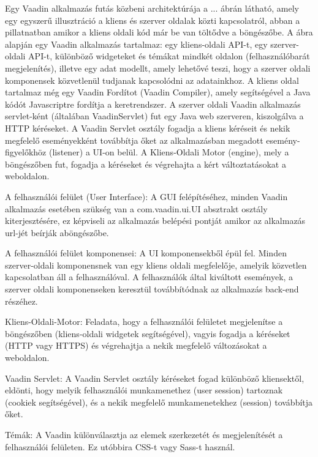 \par Egy Vaadin alkalmazás futás közbeni architektúrája a ... ábrán látható, amely egy egyszerű illusztráció a kliens és szerver oldalak közti kapcsolatról, abban a pillatnatban amikor a kliens oldali kód már be van töltődve a böngészőbe. A ábra alapján egy Vaadin alkalmazás tartalmaz: egy kliens-oldali API-t, egy szerver-oldali API-t, különböző widgeteket és témákat mindkét oldalon (felhasználóbarát megjelenítés), illetve egy adat modellt, amely lehetővé teszi, hogy a szerver oldali komponensek közvetlenül tudjanak kapcsolódni az adatainkhoz. A kliens oldal tartalmaz még egy Vaadin Fordítot (Vaadin Compiler), amely segítségével a Java kódót Javascriptre fordítja a keretrendszer. A szerver oldali Vaadin alkalmazás servlet-ként (általában VaadinServlet) fut egy Java web szerveren, kiszolgálva a HTTP kéréseket. A Vaadin Servlet osztály fogadja a kliens kéréseit és nekik megfelelő eseményekként továbbítja őket az alkalmazásban megadott esemény-ﬁgyelőkhöz (listener) a UI-on belül. A Kliens-Oldali Motor (engine), mely a böngészőben fut, fogadja a kéréseket és végrehajta a kért változtatásokat a weboldalon.
\par A felhasználói felület (User Interface): A GUI felépítéséhez, minden Vaadin alkalmazás esetében szükség van a com.vaadin.ui.UI absztrakt osztály kiterjesztésére, ez képviseli az alkalmazás belépési pontját amikor az alkalmazás url-jét beírják aböngészőbe.
\par A felhasználói felület komponensei: A UI komponensekből épül fel. Minden szerver-oldali komponensnek van egy kliens oldali megfelelője, amelyik közvetlen kapcsolatban áll a felhasználóval. A felhasználók által kiváltott események, a szerver oldali komponenseken keresztül továbbítódnak az alkalmazás back-end részéhez.
\par Kliens-Oldali-Motor: Feladata, hogy a felhasználói felületet megjelenítse a böngészőben (kliens-oldali widgetek segítségével), vagyis fogadja a kéréseket (HTTP vagy HTTPS) és végrehajtja a nekik megfelelő változásokat a weboldalon.
\par Vaadin Servlet: A Vaadin Servlet osztály kéréseket fogad különböző kliensektől, eldönti, hogy melyik felhasználói munkamenethez (user session) tartoznak (cookiek segítségével), és a nekik megfelelő munkamenetekhez (session) továbbítja őket.
\par Témák: A Vaadin különválasztja az elemek szerkezetét és megjelenítését a felhasználói felületen. Ez utóbbira CSS-t vagy Sass-t használ.



